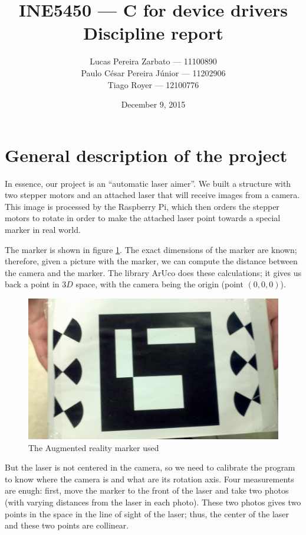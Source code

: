 \documentclass{article}
\begin{document}
\title{
    INE5450 --- C for device drivers \\
    Discipline report
}
\author{
    Lucas Pereira Zarbato --- 11100890 \\
    Paulo César Pereira Júnior --- 11202906 \\
    Tiago Royer --- 12100776
}
\date{December 9, 2015}
\maketitle

\section{General description of the project}

In essence, our project is an ``automatic laser aimer''.
We built a structure with two stepper motors and an attached laser
that will receive images from a camera.
This image is processed by the Raspberry Pi,
which then orders the stepper motors to rotate in order to
make the attached laser point towards a special marker in real world.

The marker is shown in figure \ref{fig:marker}.
The exact dimensions of the marker are known;
therefore, given a picture with the marker,
we can compute the distance between the camera and the marker.
The library ArUco does these calculations;
it gives us back a point in $3D$ space,
with the camera being the origin (point $(0, 0, 0)$).

\begin{figure}[h!]
    \includegraphics[scale=0.1]{imgs/marker.jpg}
    \caption{The Augmented reality marker used}
    \label{fig:marker}

\end{figure}
But the laser is not centered in the camera,
so we need to calibrate the program to know where the camera is
and what are its rotation axis.
Four measurements are enugh:
first, move the marker to the front of the laser and take two photos
(with varying distances from the laser in each photo).
These two photos gives two points in the space
in the line of sight of the laser;
thus, the center of the laser and these two points are collinear.
\end{document}
